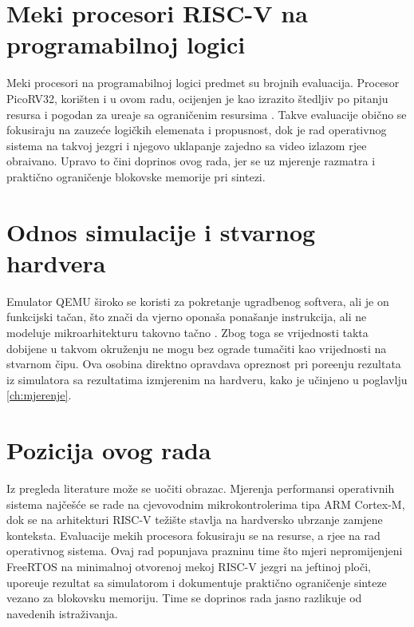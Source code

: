 \section{Meki procesori RISC-V na programabilnoj logici}
\label{sec:srodni-softcore}

Meki procesori na programabilnoj logici predmet su brojnih evaluacija. Procesor
PicoRV32, kori\v{s}ten i u ovom radu, ocijenjen je kao izrazito \v{s}tedljiv po
pitanju resursa i pogodan za ure\dj{}aje sa ograni\v{c}enim resursima
\citep{jahnke2023picorv32}. Takve evaluacije obi\v{c}no se fokusiraju na
zauze\'ce logi\v{c}kih elemenata i propusnost, dok je rad operativnog sistema na
takvoj jezgri i njegovo uklapanje zajedno sa video izlazom rje\dj{}e obra\dj{}ivano.
Upravo to \v{c}ini doprinos ovog rada, jer se uz mjerenje razmatra i prakti\v{c}no
ograni\v{c}enje blokovske memorije pri sintezi.

\section{Odnos simulacije i stvarnog hardvera}
\label{sec:srodni-qemu}

Emulator QEMU \v{s}iroko se koristi za pokretanje ugradbenog softvera, ali je on
funkcijski ta\v{c}an, \v{s}to zna\v{c}i da vjerno opona\v{s}a pona\v{s}anje
instrukcija, ali ne modeluje mikroarhitekturu takovno ta\v{c}no \citep{qemu}.
Zbog toga se vrijednosti takta dobijene u takvom okru\v{z}enju ne mogu bez ograde
tuma\v{c}iti kao vrijednosti na stvarnom \v{c}ipu. Ova osobina direktno opravdava
opreznost pri pore\dj{}enju rezultata iz simulatora \citep{thesisqemu} sa
rezultatima izmjerenim na hardveru, kako je u\v{c}injeno u poglavlju
\ref{ch:mjerenje}.

\section{Pozicija ovog rada}
\label{sec:srodni-pozicija}

Iz pregleda literature mo\v{z}e se uo\v{c}iti obrazac. Mjerenja performansi
operativnih sistema naj\v{c}e\v{s}\'ce se rade na cjevovodnim mikrokontrolerima
tipa ARM Cortex-M, dok se na arhitekturi RISC-V te\v{z}i\v{s}te stavlja na
hardversko ubrzanje zamjene konteksta. Evaluacije mekih procesora fokusiraju se
na resurse, a rje\dj{}e na rad operativnog sistema. Ovaj rad popunjava prazninu
time \v{s}to mjeri nepromijenjeni FreeRTOS na minimalnoj otvorenoj mekoj RISC-V
jezgri na jeftinoj plo\v{c}i, upore\dj{}uje rezultat sa simulatorom i dokumentuje
prakti\v{c}no ograni\v{c}enje sinteze vezano za blokovsku memoriju. Time se
doprinos rada jasno razlikuje od navedenih istra\v{z}ivanja.

